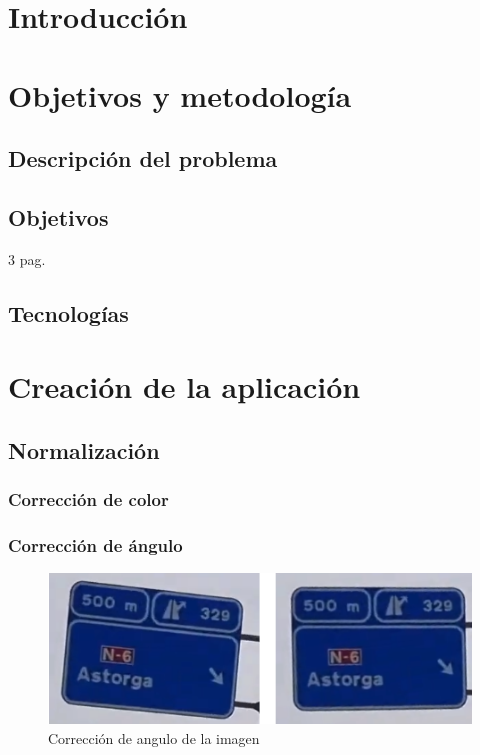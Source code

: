 \documentclass[a4paper, 12pt]{article}
\begin{document}
\section{Introducción}
\section{Objetivos y metodología}

\subsection{Descripción del problema}

\subsection{Objetivos}
3 pag.
\subsection{Tecnologías}


\section{Creación de la aplicación}
\subsection{Normalización}
\subsubsection{Corrección de color}
\subsubsection{Corrección de ángulo}
\begin{figure}[h]
	\centering
	\includegraphics[width=0.8\linewidth]{img/norma_angulo}
	\caption{Corrección de angulo de la imagen}
	\label{fig:normaangulo}
\end{figure}
\end{document}
